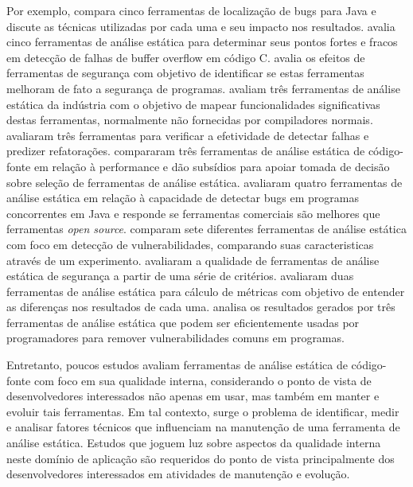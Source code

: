 Por exemplo,  compara cinco ferramentas de localização
de bugs para Java e discute as técnicas utilizadas por cada uma e seu impacto
nos resultados.  avalia cinco ferramentas de
análise estática para determinar seus pontos fortes e fracos em detecção de
falhas de buffer overflow em código C.  avalia os efeitos
de ferramentas de segurança com objetivo de identificar se estas ferramentas
melhoram de fato a segurança de programas. 
avaliam três ferramentas de análise estática da indústria com o objetivo de
mapear funcionalidades significativas destas ferramentas, normalmente não
fornecidas por compiladores normais.  avaliaram três
ferramentas para verificar a efetividade de detectar falhas e predizer
refatorações.  compararam três ferramentas de análise
estática de código-fonte em relação à performance e dão subsídios para apoiar
tomada de decisão sobre seleção de ferramentas de análise estática.
 avaliaram quatro ferramentas de análise estática em
relação à capacidade de detectar bugs em programas concorrentes em Java e
responde se ferramentas comerciais são melhores que ferramentas {\it open
source}.  comparam sete diferentes ferramentas de análise
estática com foco em detecção de vulnerabilidades, comparando suas
caracteristicas através de um experimento.  avaliaram a
qualidade de ferramentas de análise estática de segurança a partir de uma
série de critérios.  avaliaram duas ferramentas de
análise estática para cálculo de métricas com objetivo de entender as
diferenças nos resultados de cada uma.  analisa os
resultados gerados por três ferramentas de análise estática que podem ser
eficientemente usadas por programadores para remover vulnerabilidades comuns
em programas.

Entretanto, poucos estudos avaliam ferramentas de análise estática de
código-fonte com foco em sua qualidade interna, considerando o ponto de vista
de desenvolvedores interessados não apenas em usar, mas também em manter e
evoluir tais ferramentas. Em tal contexto, surge o problema de identificar,
medir e analisar fatores técnicos que influenciam na manutenção de uma
ferramenta de análise estática. Estudos que joguem luz sobre aspectos da
qualidade interna neste domínio de aplicação são requeridos do ponto de vista
principalmente dos desenvolvedores interessados em atividades de manutenção e
evolução.

